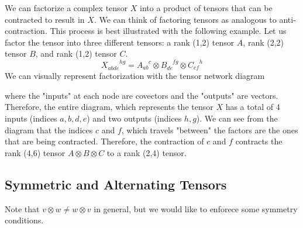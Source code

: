 	\begin{example}
	  \label{ex:tensor-decompositions-as-networks}
    We can factorize a complex tensor $X$ into a product of tensors that can be contracted to result in $X$. We can think of factoring tensors as analogous to anti-contraction. This process is best illustrated with the following example. Let us factor the tensor into three different tensors: a rank (1,2) tensor $A$, rank (2,2) tensor $B$, and rank (1,2) tensor $C$. 
    \begin{equation}
      X_{abde}^{\qquad hg} = A_{ab}^{\quad c} \otimes B_{de}^{\quad fg} \otimes C_{cf}^{\quad h}
    \end{equation}
    We can visually represent factorization with the tensor network diagram
    \begin{center}
    \end{center}
    where the "inputs" at each node are covectors and the "outputs" are vectors. Therefore, the entire diagram, which represents the tensor $X$ has a total of 4 inputs (indices $a, b, d, e$) and two outputs (indices $h, g$). We can see from the diagram that the indices $c$ and $f$, which travels "between" the factors are the ones that are being contracted. Therefore, the contraction of $c$ and $f$ contracts the rank (4,6) tensor $A \otimes B \otimes C$ to a rank (2,4) tensor. 
  \end{example}

\subsection{Symmetric and Alternating Tensors}

	Note that $v \otimes w \neq w \otimes v$ in general, but we would like to enforece some symmetry conditions. 

